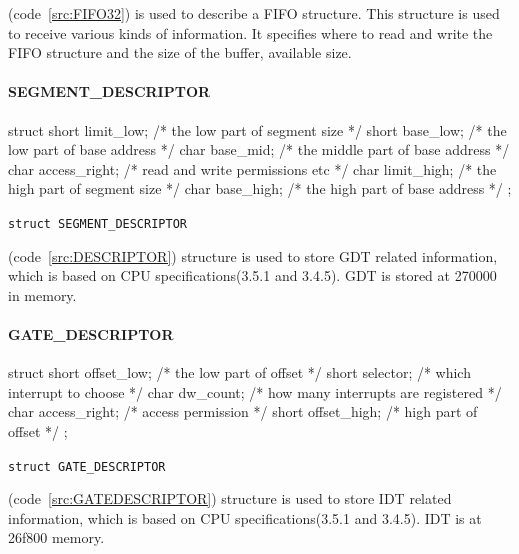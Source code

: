 \documentclass{swfcthesis}
\begin{document}
(code~\ref{src:FIFO32}) is used to
describe a FIFO structure. This structure is used to receive various kinds of
information. It specifies where to read and write the FIFO structure and the size of the
buffer, available size.


\paragraph{SEGMENT\_DESCRIPTOR}

\begin{listing}[H]
  \begin{codeblock}
\begin{ccode}
struct 
{ 
  short limit_low;   /* the low part of segment size */
  short base_low;    /* the low part of base address */
  char base_mid;     /* the middle part of base address */
  char access_right; /* read and write permissions etc */
  char  limit_high;  /* the high part of segment size */
  char base_high;    /* the high part of base address */
};
\end{ccode}
  \end{codeblock}
  \caption{\texttt{struct SEGMENT\_DESCRIPTOR}}\label{src:DESCRIPTOR}
\end{listing}

(code~\ref{src:DESCRIPTOR}) structure is
used to store GDT related information, which is based on CPU specifications(3.5.1 and
3.4.5\cite{intel_3a}). GDT is stored at 270000 in memory.


\paragraph{GATE\_DESCRIPTOR}

\begin{listing}[H]
  \begin{codeblock}
\begin{ccode}
struct 
{ 
  short offset_low;   /* the low part of offset */
  short selector;     /* which interrupt to choose */
  char dw_count;      /* how many interrupts are registered */
  char access_right;  /* access permission */
  short  offset_high; /* high part of offset */
};
\end{ccode}
  \end{codeblock}
  \caption{\texttt{struct GATE\_DESCRIPTOR}}\label{src:GATEDESCRIPTOR}
\end{listing}

(code~\ref{src:GATEDESCRIPTOR}) structure is used to
store IDT related information, which is based on CPU specifications(3.5.1 and
3.4.5\cite{intel_3a}). IDT is at 26f800 memory.
\end{document}
